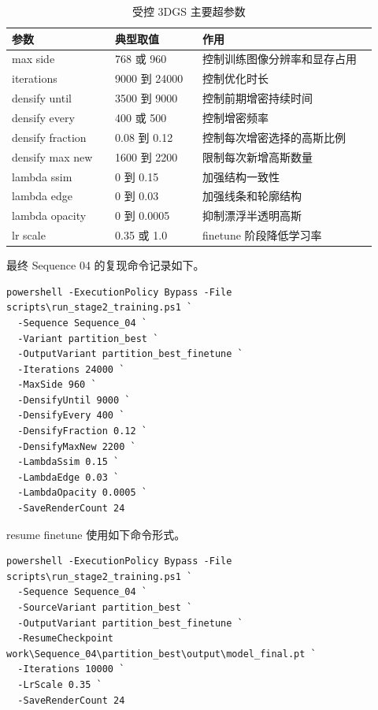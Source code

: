 \documentclass[UTF8,a4paper,11pt]{ctexart}
\begin{document}
\begin{table}[H]
\centering
\caption{受控 3DGS 主要超参数}
\label{tab:hyperparams}
\begin{tabular}{p{0.26\linewidth}p{0.22\linewidth}p{0.44\linewidth}}
\toprule
参数 & 典型取值 & 作用 \\
\midrule
max side & 768 或 960 & 控制训练图像分辨率和显存占用 \\
iterations & 9000 到 24000 & 控制优化时长 \\
densify until & 3500 到 9000 & 控制前期增密持续时间 \\
densify every & 400 或 500 & 控制增密频率 \\
densify fraction & 0.08 到 0.12 & 控制每次增密选择的高斯比例 \\
densify max new & 1600 到 2200 & 限制每次新增高斯数量 \\
lambda ssim & 0 到 0.15 & 加强结构一致性 \\
lambda edge & 0 到 0.03 & 加强线条和轮廓结构 \\
lambda opacity & 0 到 0.0005 & 抑制漂浮半透明高斯 \\
lr scale & 0.35 或 1.0 & finetune 阶段降低学习率 \\
\bottomrule
\end{tabular}
\end{table}

最终 Sequence 04 的复现命令记录如下。

\begin{lstlisting}[language={},caption={Sequence 04 最终训练命令}]
powershell -ExecutionPolicy Bypass -File scripts\run_stage2_training.ps1 `
  -Sequence Sequence_04 `
  -Variant partition_best `
  -OutputVariant partition_best_finetune `
  -Iterations 24000 `
  -MaxSide 960 `
  -DensifyUntil 9000 `
  -DensifyEvery 400 `
  -DensifyFraction 0.12 `
  -DensifyMaxNew 2200 `
  -LambdaSsim 0.15 `
  -LambdaEdge 0.03 `
  -LambdaOpacity 0.0005 `
  -SaveRenderCount 24
\end{lstlisting}

resume finetune 使用如下命令形式。

\begin{lstlisting}[language={},caption={低学习率 finetune 命令}]
powershell -ExecutionPolicy Bypass -File scripts\run_stage2_training.ps1 `
  -Sequence Sequence_04 `
  -SourceVariant partition_best `
  -OutputVariant partition_best_finetune `
  -ResumeCheckpoint work\Sequence_04\partition_best\output\model_final.pt `
  -Iterations 10000 `
  -LrScale 0.35 `
  -SaveRenderCount 24
\end{lstlisting}
\end{document}
